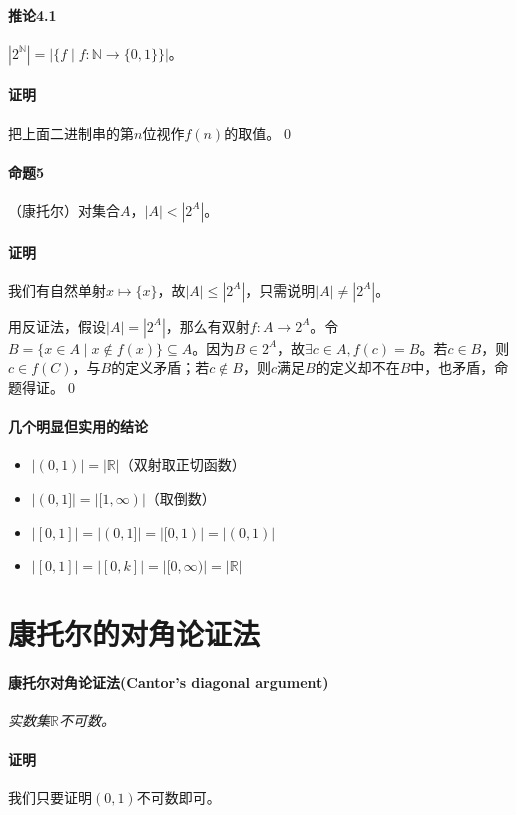 \documentclass[b5paper,oneside]{ctexbook}
\begin{document}
\paragraph{推论4.1}$|2^\mathbb{N}|=|\{f\mid f:\mathbb{N}\to\{0,1\}\}|$。
\paragraph{证明}把上面二进制串的第$n$位视作$f(n)$的取值。\hfill\qed
\paragraph{命题5}（康托尔）对集合$A$，$|A|<|2^A|$。
\paragraph{证明}我们有自然单射$x\mapsto\{x\}$，故$|A|\leq |2^A|$，只需说明$|A|\neq |2^A|$。

用反证法，假设$|A|=|2^A|$，那么有双射$f:A\to 2^A$。令$B=\{x\in A\mid x\not\in f(x)\}\subseteq A$。因为$B\in 2^A$，故$\exists c\in A, f(c)=B$。若$c\in B$，则$c\in f(C)$，与$B$的定义矛盾；若$c\not\in B$，则$c$满足$B$的定义却不在$B$中，也矛盾，命题得证。\hfill\qed
\paragraph{几个明显但实用的结论}
\begin{itemize}
\item $|(0,1)|=|\mathbb{R}|$（双射取正切函数）
\item $|(0,1]|=|[1,\infty )|$（取倒数）
\item $|[0,1]|=|(0,1]|=|[0,1)|=|(0,1)|$
\item $|[0,1]|=|[0,k]|=|[0,\infty)|=|\mathbb{R}|$
\end{itemize}
\section{康托尔的对角论证法}
\paragraph{康托尔对角论证法(Cantor's diagonal argument)}\textit{实数集$\mathbb{R}$不可数。}
\paragraph{证明}我们只要证明$(0,1)$不可数即可。
\end{document}
